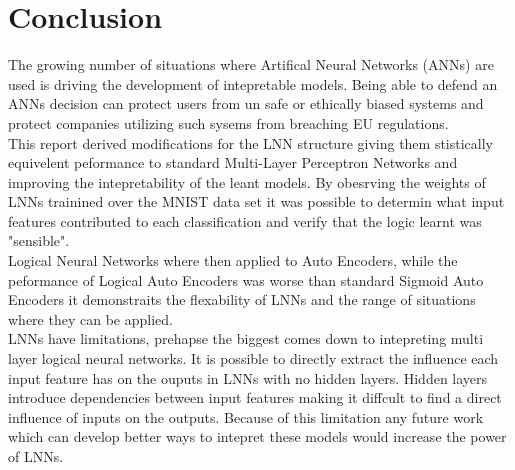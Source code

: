 \chapter{Conclusion}\label{C:con}


The growing number of situations where Artifical Neural Networks (ANNs) are used is driving the development of intepretable models. Being able to defend an ANNs decision can protect users from un safe or ethically biased systems and protect companies utilizing such sysems from breaching EU regulations.\\

This report derived modifications for the LNN structure giving them stistically equivelent peformance to standard Multi-Layer Perceptron Networks and improving the intepretability of the leant models. By obesrving the weights of LNNs trainined over the MNIST data set it was possible to determin what input features contributed to each classification and verify that the logic learnt was "sensible".\\

Logical Neural Networks where then applied to Auto Encoders, while the peformance of Logical Auto Encoders was worse than standard Sigmoid Auto Encoders it demonstraits the flexability of LNNs and the range of situations where they can be applied.\\

LNNs have limitations, prehapse the biggest comes down to intepreting multi layer logical neural networks. It is possible to directly extract the influence each input feature has on the ouputs in LNNs with no hidden layers. Hidden layers introduce dependencies between input features making it diffcult to find a direct influence of inputs on the outputs. Because of this limitation any future work which can develop better ways to intepret these models would increase the power of LNNs.

